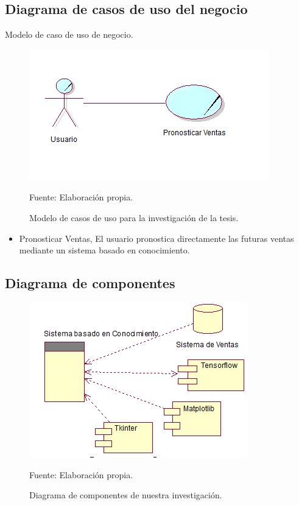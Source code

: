 \subsection{Diagrama de casos de uso del negocio}
Modelo de caso de uso de negocio.

\begin{figure}[h!]
	\centering
		\includegraphics[scale=0.7]{imagenes/casosdeusonegocio.png}
		\caption{Modelo de casos de uso para la investigación de la tesis.}
	\begin{center}
    Fuente: Elaboración propia.
    \end{center}
	\label{fig:diagramaCasosUsoTesis}
\end{figure}
\begin{itemize}
    \item Pronosticar Ventas, El usuario pronostica directamente las futuras ventas mediante un sistema basado en conocimiento.
\end{itemize}

\subsection{Diagrama de componentes}
\begin{figure}[h!]
	\centering
		\includegraphics[scale=1]{imagenes/diagramacomponentes.png}
		\caption{Diagrama de componentes de nuestra investigación.}
	\begin{center}
    Fuente: Elaboración propia.
    \end{center}
	\label{fig:diagramadecomponentes}
\end{figure}
\newpage
